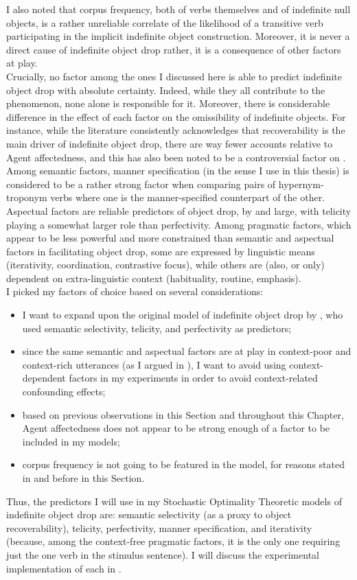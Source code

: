 I also noted that corpus frequency, both of verbs themselves and of indefinite null objects, is a rather unreliable correlate of the likelihood of a transitive verb participating in the implicit indefinite object construction. Moreover, it is never a direct cause of indefinite object drop \textemdash rather, it is a consequence of other factors at play.\\
Crucially, no factor among the ones I discussed here is able to predict indefinite object drop with absolute certainty. Indeed, while they all contribute to the phenomenon, none alone is responsible for it. Moreover, there is considerable difference in the effect of each factor on the omissibility of indefinite objects. For instance, while the literature consistently acknowledges that recoverability is the main driver of indefinite object drop, there are way fewer accounts relative to Agent affectedness, and this has also been noted to be a controversial factor on . Among semantic factors, manner specification (in the sense I use in this thesis) is considered to be a rather strong factor when comparing pairs of hypernym-troponym verbs where one is the manner-specified counterpart of the other. Aspectual factors are reliable predictors of object drop, by and large, with telicity playing a somewhat larger role than perfectivity. Among pragmatic factors, which appear to be less powerful and more constrained than semantic and aspectual factors in facilitating object drop, some are expressed by linguistic means (iterativity, coordination, contrastive focus), while others are (also, or only) dependent on extra-linguistic context (habituality, routine, emphasis).\\
I picked my factors of choice based on several considerations:
\begin{itemize}
    \item I want to expand upon the original model of indefinite object drop by \textcite{Medina2007}, who used semantic selectivity, telicity, and perfectivity as predictors;
    \item since the same semantic and aspectual factors are at play in context-poor and context-rich utterances (as I argued in ), I want to avoid using context-dependent factors in my experiments in order to avoid context-related confounding effects;
    \item based on previous observations in this Section and throughout this Chapter, Agent affectedness does not appear to be strong enough of a factor to be included in my models;
    \item corpus frequency is not going to be featured in the model, for reasons stated in  and before in this Section.
\end{itemize}

Thus, the predictors I will use in my Stochastic Optimality Theoretic models of indefinite object drop are: semantic selectivity (as a proxy to object recoverability), telicity, perfectivity, manner specification, and iterativity (because, among the context-free pragmatic factors, it is the only one requiring just the one verb in the stimulus sentence). I will discuss the experimental implementation of each in .